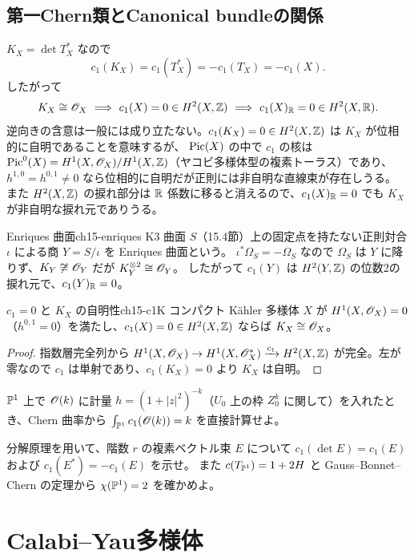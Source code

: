 \subsection{第一Chern類とCanonical bundleの関係}

$K_X = \det T^*_X$ なので
\[
c_1(K_X) = c_1(T^*_X) = -c_1(T_X) = -c_1(X).
\]
したがって
\[
K_X\cong\OO_X\ \Longrightarrow\ c_1(X) = 0\in H^2(X,\Z)\ \Longrightarrow\ c_1(X)_\R = 0\in H^2(X,\R).
\]
逆向きの含意は一般には成り立たない。$c_1(K_X)=0\in H^2(X,\mathbb{Z})$ は $K_X$ が位相的に自明であることを意味するが、
$\operatorname{Pic}(X)$ の中で $c_1$ の核は $\operatorname{Pic}^0(X) = H^1(X,\mathscr{O}_X)/H^1(X,\mathbb{Z})$（ヤコビ多様体型の複素トーラス）であり、
$h^{1,0}=h^{0,1}\neq 0$ なら位相的に自明だが正則には非自明な直線束が存在しうる。
また $H^2(X,\mathbb{Z})$ の捩れ部分は $\mathbb{R}$ 係数に移ると消えるので、$c_1(X)_{\mathbb{R}}=0$ でも $K_X$ が非自明な捩れ元でありうる。

\begin{myex}{Enriques 曲面}{ch15-enriques}
K3 曲面 $S$（15.4節）上の固定点を持たない正則対合 $\iota$ による商 $Y = S/\iota$ を Enriques 曲面という。
$\iota^*\Omega_S = -\Omega_S$ なので $\Omega_S$ は $Y$ に降りず、$K_Y\not\cong\mathscr{O}_Y$ だが $K_Y^{\otimes 2}\cong\mathscr{O}_Y$。
したがって $c_1(Y)$ は $H^2(Y,\mathbb{Z})$ の位数2の捩れ元で、$c_1(Y)_{\mathbb{R}} = 0$。
\end{myex}

\begin{myprop}{$c_1=0$ と $K_X$ の自明性}{ch15-c1K}
コンパクト K\"ahler 多様体 $X$ が $H^1(X,\mathscr{O}_X) = 0$（$h^{0,1}=0$）を満たし、$c_1(X) = 0\in H^2(X,\mathbb{Z})$ ならば $K_X\cong\mathscr{O}_X$。
\end{myprop}

\begin{proof}
指数層完全列から $H^1(X,\mathscr{O}_X)\to H^1(X,\mathscr{O}_X^*)\xrightarrow{c_1}H^2(X,\mathbb{Z})$ が完全。左が零なので $c_1$ は単射であり、$c_1(K_X) = 0$ より $K_X$ は自明。
\end{proof}

$\mathbb{P}^1$ 上で $\mathscr{O}(k)$ に計量 $h = (1+|z|^2)^{-k}$（$U_0$ 上の枠 $Z_0^k$ に関して）を入れたとき、Chern 曲率から $\int_{\mathbb{P}^1}c_1(\mathscr{O}(k)) = k$ を直接計算せよ。

分解原理を用いて、階数 $r$ の複素ベクトル束 $E$ について $c_1(\det E) = c_1(E)$ および $c_1(E^*) = -c_1(E)$ を示せ。
また $c(T_{\mathbb{P}^1}) = 1+2H$ と Gauss--Bonnet--Chern の定理から $\chi(\mathbb{P}^1)=2$ を確かめよ。

\section{Calabi--Yau多様体}

